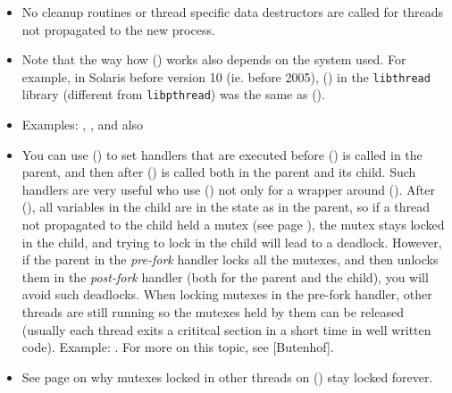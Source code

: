 \begin{itemize}
\item No cleanup routines or thread specific data destructors are called for
threads not propagated to the new process.
\item \label{FORKALL} Note that the way how () works also depends on
the system used.  For example, in Solaris before version 10 (ie. before 2005),
() in the \texttt{libthread} library (different from
\texttt{libpthread}) was the same as ().
\item Examples: ,
, and also 
\item \label{ATFORK} You can use () to set handlers that
are executed before () is called in the parent, and then after
() is called both in the parent and its child.  Such handlers are
very useful who use () not only for a wrapper around ().
After (), all variables in the child are in the state as in the
parent, so if a thread not propagated to the child held a mutex (see page
\pageref{MUTEXES}), the mutex stays
locked in the child, and trying to lock in the child will lead to a deadlock.
However, if the parent in the \emph{pre-fork} handler locks all the mutexes, and
then unlocks them in the \emph{post-fork} handler (both for the parent and the
child), you will avoid such deadlocks.  When locking mutexes in the
pre-fork handler, other threads are still running so the mutexes held by them
can be released (usually each thread exits a crititcal section in a short time
in well written code).  Example: .  For more on this
topic, see [Butenhof].
\item See page \pageref{MUTEXES} on why mutexes locked in other threads on
() stay locked forever.
\end{itemize}



